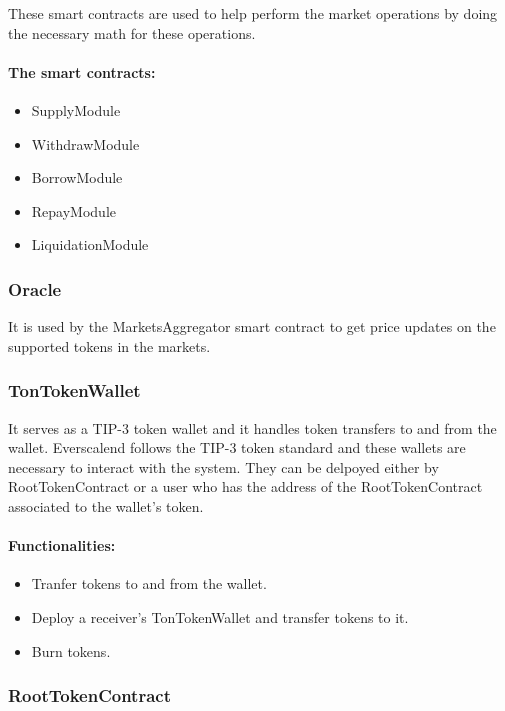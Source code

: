 These smart contracts are used to help perform the market operations by doing the necessary math for these operations.

\paragraph*{The smart contracts:}
\begin{itemize}
  \item SupplyModule
  \item WithdrawModule
  \item BorrowModule
  \item RepayModule
  \item LiquidationModule
\end{itemize}

\subsubsection{Oracle}

It is used by the MarketsAggregator smart contract to get price updates on the supported tokens in the markets.

\subsubsection{TonTokenWallet}

It serves as a TIP-3 token wallet and it handles token transfers to and from the wallet. Everscalend follows the TIP-3 token standard and these wallets are necessary to interact with the system. They can be delpoyed either by RootTokenContract or a user who has the address of the RootTokenContract associated to the wallet's token.

\paragraph*{Functionalities:}
\begin{itemize}
  \item Tranfer tokens to and from the wallet.
  \item Deploy a receiver's TonTokenWallet and transfer tokens to it.
  \item Burn tokens.
\end{itemize}

\subsubsection{RootTokenContract}

